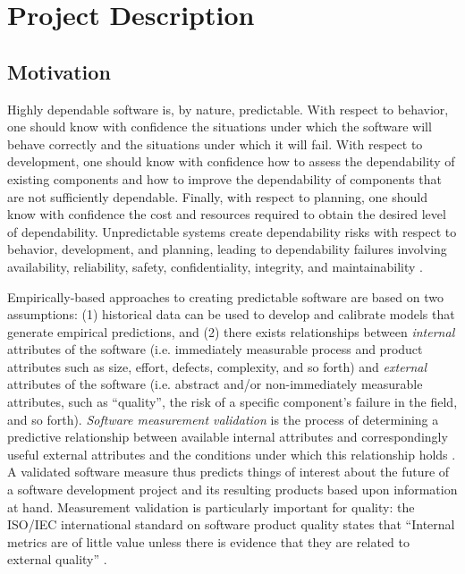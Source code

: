 
\section{Project Description}

\subsection{Motivation}

Highly dependable software is, by nature, predictable.  With respect to
behavior, one should know with confidence the situations under which the
software will behave correctly and the situations under which it will fail.
With respect to development, one should know with confidence how to assess
the dependability of existing components and how to improve the
dependability of components that are not sufficiently dependable. Finally,
with respect to planning, one should know with confidence the cost and
resources required to obtain the desired level of dependability.
Unpredictable systems create dependability risks with respect to behavior,
development, and planning, leading to dependability failures involving
availability, reliability, safety, confidentiality, integrity, and
maintainability \cite{Avizienis01}.

Empirically-based approaches to creating predictable software are based on
two assumptions: (1) historical data can be used to develop and calibrate
models that generate empirical predictions, and (2) there exists
relationships between {\em internal} attributes of the software (i.e.
immediately measurable process and product attributes such as size, effort,
defects, complexity, and so forth) and {\em external} attributes of the
software (i.e. abstract and/or non-immediately measurable attributes, such
as ``quality'', the risk of a specific component's
failure in the field, and so forth).  {\em Software measurement validation}
is the process of determining a predictive relationship between available
internal attributes and correspondingly useful external attributes and the
conditions under which this relationship holds \cite{Emam01}. A validated
software measure thus predicts things of interest about the future of a
software development project and its resulting products based upon
information at hand.  Measurement validation is particularly important for
quality: the ISO/IEC international standard on software product quality
states that ``Internal metrics are of little value unless there is evidence
that they are related to external quality'' \cite{iso14598}.

